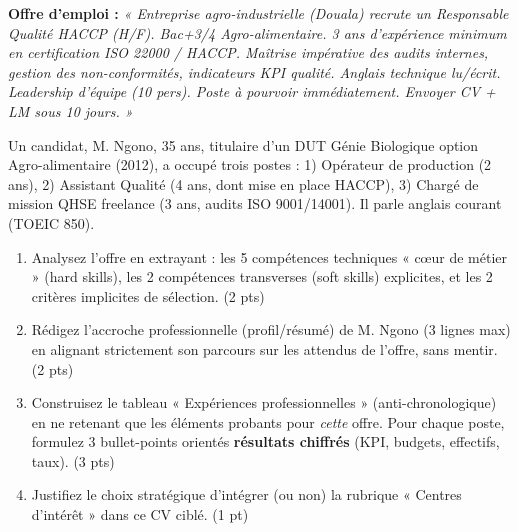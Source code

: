 \documentclass[11pt]{article}
\begin{document}
\begin{exercice}
\textbf{Offre d'emploi :} \textit{« Entreprise agro-industrielle (Douala) recrute un Responsable Qualité HACCP (H/F). Bac+3/4 Agro-alimentaire. 3 ans d'expérience minimum en certification ISO 22000 / HACCP. Maîtrise impérative des audits internes, gestion des non-conformités, indicateurs KPI qualité. Anglais technique lu/écrit. Leadership d'équipe (10 pers). Poste à pourvoir immédiatement. Envoyer CV + LM sous 10 jours. »}

Un candidat, M. Ngono, 35 ans, titulaire d'un DUT Génie Biologique option Agro-alimentaire (2012), a occupé trois postes : 1) Opérateur de production (2 ans), 2) Assistant Qualité (4 ans, dont mise en place HACCP), 3) Chargé de mission QHSE freelance (3 ans, audits ISO 9001/14001). Il parle anglais courant (TOEIC 850).
\begin{enumerate}
    \item Analysez l'offre en extrayant : les 5 compétences techniques « cœur de métier » (hard skills), les 2 compétences transverses (soft skills) explicites, et les 2 critères implicites de sélection. (2 pts)
    \item Rédigez l'accroche professionnelle (profil/résumé) de M. Ngono (3 lignes max) en alignant strictement son parcours sur les attendus de l'offre, sans mentir. (2 pts)
    \item Construisez le tableau « Expériences professionnelles » (anti-chronologique) en ne retenant que les éléments probants pour \textit{cette} offre. Pour chaque poste, formulez 3 bullet-points orientés \textbf{résultats chiffrés} (KPI, budgets, effectifs, taux). (3 pts)
    \item Justifiez le choix stratégique d'intégrer (ou non) la rubrique « Centres d'intérêt » dans ce CV ciblé. (1 pt)
\end{enumerate}
\end{exercice}
\end{document}
